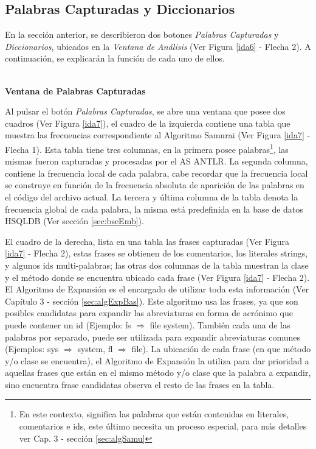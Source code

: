 \subsection{Palabras Capturadas y Diccionarios}
\label{sec:panPalDicc}

En la sección anterior, se describieron dos botones \textit{Palabras Capturadas} y \textit{Diccionarios}, ubicados en la \textit{Ventana de Análisis} (Ver Figura \ref{ida6} - Flecha 2). A continuación, se explicarán la función de cada uno de ellos.

\noindent \textbf{\\Ventana de Palabras Capturadas\\} 

Al pulsar el botón \textit{Palabras Capturadas}, se abre una ventana que posee dos cuadros (Ver Figura \ref{ida7}), el cuadro de la izquierda contiene una tabla que muestra las frecuencias correspondiente al Algoritmo Samurai (Ver Figura \ref{ida7} - Flecha 1). Esta tabla tiene tres columnas, en la primera posee palabras\footnote[1]{En este contexto, significa las palabras que están contenidas en literales, comentarios e ids, este último necesita un proceso especial, para más detalles ver Cap. 3 - sección \ref{sec:algSamu}}, las mismas fueron capturadas y procesadas por el AS ANTLR. La segunda columna, contiene la frecuencia local de cada palabra, cabe recordar que la frecuencia local se construye en función de la frecuencia absoluta de aparición de las palabras en el código del archivo actual. La tercera y última columna de la tabla denota la frecuencia global de cada palabra, la misma está predefinida en la base de datos HSQLDB (Ver sección \ref{sec:bseEmb}).

El cuadro de la derecha, lista en una tabla las frases capturadas (Ver Figura \ref{ida7} - Flecha 2), estas frases se obtienen de los comentarios, los literales strings, y algunos ids multi-palabras; las otras dos columnas de la tabla muestran la clase y el método donde se encuentra ubicado cada frase (Ver Figura \ref{ida7} - Flecha 2).
El Algoritmo de Expansión es el encargado de utilizar toda esta información (Ver Capítulo 3 - sección \ref{sec:algExpBas}). Este algoritmo usa las frases, ya que son posibles candidatas para expandir las abreviaturas en forma de acrónimo que puede contener un id (Ejemplo: \textsf{fs} $\Rightarrow$ \textsf{file system}). También cada una de las palabras por separado, puede ser utilizada para expandir abreviaturas comunes (Ejemplos: \textsf{sys} $\Rightarrow$ \textsf{system}, \textsf{fl} $\Rightarrow$ \textsf{file}). La ubicación de cada frase (en que método y/o clase se encuentra), el Algoritmo de Expansión la utiliza para dar prioridad a aquellas frases que están en el mismo método y/o clase que la palabra a expandir, sino encuentra frase candidatas observa el resto de las frases en la tabla.

